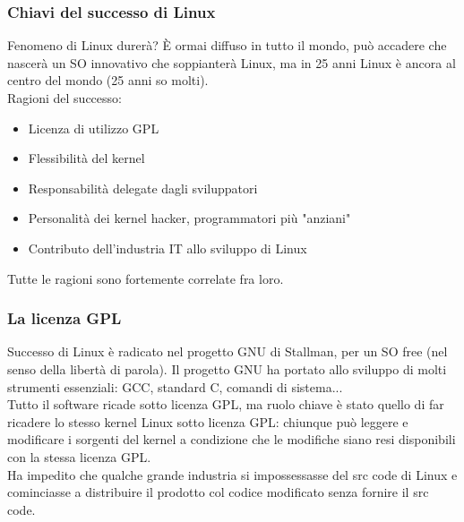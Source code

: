 \documentclass[12pt, oneside]{extbook}
\begin{document}
\subsubsection{Chiavi del successo di Linux}
Fenomeno di Linux durerà? È ormai diffuso in tutto il mondo, può accadere che nascerà un SO innovativo che soppianterà Linux, ma in 25 anni Linux è ancora al centro del mondo (25 anni so molti).\\ Ragioni del successo:
\begin{itemize}
\item Licenza di utilizzo GPL
\item Flessibilità del kernel
\item Responsabilità delegate dagli sviluppatori
\item Personalità dei kernel hacker, programmatori più "anziani"
\item Contributo dell'industria IT allo sviluppo di Linux
\end{itemize}
Tutte le ragioni sono fortemente correlate fra loro.
\subsubsection{La licenza GPL}
Successo di Linux è radicato nel progetto GNU di Stallman, per un SO free (nel senso della libertà di parola). Il progetto GNU ha portato allo sviluppo di molti strumenti essenziali: GCC, standard C, comandi di sistema...\\ Tutto il software ricade sotto licenza GPL, ma ruolo chiave è stato quello di far ricadere lo stesso kernel Linux sotto licenza GPL: chiunque può leggere e modificare i sorgenti del kernel a condizione che le modifiche siano resi disponibili con la stessa licenza GPL.\\ Ha impedito che qualche grande industria si impossessasse del src code di Linux e cominciasse a distribuire il prodotto col codice modificato senza fornire il src code.
\end{document}
